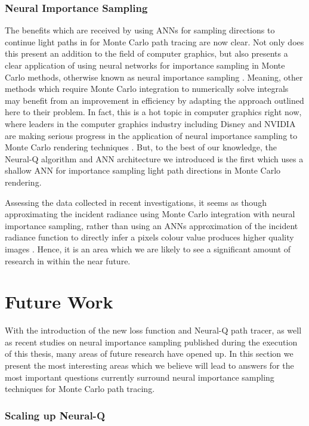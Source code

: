 \documentclass[../dissertation.tex]{subfiles}
\begin{document}
\subsubsection*{Neural Importance Sampling}
The benefits which are received by using ANNs for sampling directions to continue light paths in for Monte Carlo path tracing are now clear. Not only does this present an addition to the field of computer graphics, but also presents a clear application of using neural networks for importance sampling in Monte Carlo methods, otherwise known as neural importance sampling \cite{keller2019integral}. Meaning, other methods which require Monte Carlo integration to numerically solve integrals may benefit from an improvement in efficiency by adapting the approach outlined here to their problem. In fact, this is a hot topic in computer graphics right now, where leaders in the computer graphics industry including Disney and NVIDIA are making serious progress in the application of neural importance sampling to Monte Carlo rendering techniques \cite{keller2019integral, muller2018neural}. But, to the best of our knowledge, the Neural-Q algorithm and ANN architecture we introduced is the first which uses a shallow ANN for importance sampling light path directions in Monte Carlo rendering.

Assessing the data collected in recent investigations, it seems as though approximating the incident radiance using Monte Carlo integration with neural importance sampling, rather than using an ANNs approximation of the incident radiance function to directly infer a pixels colour value produces higher quality images \cite{zheng2018learning, keller2019integral, muller2018neural}. Hence, it is an area which we are likely to see a significant amount of research in within the near future.

\section{Future Work}

With the introduction of the new loss function and Neural-Q path tracer, as well as recent studies on neural importance sampling published during the execution of this thesis, many areas of future research have opened up. In this section we present the most interesting areas which we believe will lead to answers for the most important questions currently surround neural importance sampling techniques for Monte Carlo path tracing. 

\subsubsection{Scaling up Neural-Q}
\end{document}
